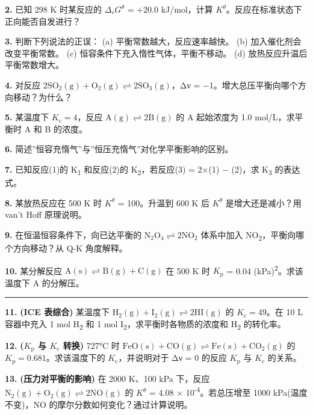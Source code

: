 \textbf{2.} 已知 298 K 时某反应的 \(\Delta_r G^\theta\) = +20.0 kJ/mol，计算 \(K^\theta\)。反应在标准状态下正向能否自发进行？

\textbf{3.} 判断下列说法的正误：
(a) 平衡常数越大，反应速率越快。
(b) 加入催化剂会改变平衡常数。
(c) 恒容条件下充入惰性气体，平衡不移动。
(d) 放热反应升温后平衡常数增大。

\textbf{4.} 对反应 \(\mathrm{2SO_2(g) + O_2(g) \rightleftharpoons 2SO_3(g)}\)，Δν = −1。增大总压平衡向哪个方向移动？为什么？

\textbf{5.} 某温度下 \(K_{\mathrm c} = 4\)，反应 \(\mathrm{A(g) \rightleftharpoons 2B(g)}\) 的 A 起始浓度为 1.0 mol/L，求平衡时 A 和 B 的浓度。

\textbf{6.} 简述''恒容充惰气''与''恒压充惰气''对化学平衡影响的区别。

\textbf{7.} 已知反应(1)的 K\textsubscript{1} 和反应(2)的 K\textsubscript{2}，若反应(3) = 2×(1) − (2)，求 K\textsubscript{3} 的表达式。

\textbf{8.} 某放热反应在 500 K 时 \(K^\theta\) = 100。升温到 600 K 后 \(K^\theta\) 是增大还是减小？用 van't Hoff 原理说明。

\textbf{9.} 在恒温恒容条件下，向已达平衡的 \(\mathrm{N_2O_4 \rightleftharpoons 2NO_2}\) 体系中加入 NO\textsubscript{2}，平衡向哪个方向移动？从 Q-K 角度解释。

\textbf{10.} 某分解反应 \(\mathrm{A(s) \rightleftharpoons B(g) + C(g)}\) 在 500 K 时 \(K_{\mathrm p}\) = 0.04 (kPa)\textsuperscript{2}。求该温度下 A 的分解压。

\begin{center}\rule{0.5\linewidth}{0.5pt}\end{center}

\textbf{11.} \textbf{(ICE 表综合)} 某温度下 \(\mathrm{H_2(g) + I_2(g) \rightleftharpoons 2HI(g)}\) 的 \(K_{\mathrm c} = 49\)。在 10 L 容器中充入 1 mol H\textsubscript{2} 和 1 mol I\textsubscript{2}，求平衡时各物质的浓度和 H\textsubscript{2} 的转化率。

\textbf{12.} \textbf{(\(K_{\mathrm p}\) 与 \(K_{\mathrm c}\) 转换)} 727°C 时 \(\mathrm{FeO(s) + CO(g) \rightleftharpoons Fe(s) + CO_2(g)}\) 的 \(K_{\mathrm p} = 0.681\)。求该温度下的 \(K_{\mathrm c}\)，并说明对于 Δν = 0 的反应 \(K_{\mathrm p}\) 与 \(K_{\mathrm c}\) 的关系。

\textbf{13.} \textbf{(压力对平衡的影响)} 在 2000 K、100 kPa 下，反应 \(\mathrm{N_2(g) + O_2(g) \rightleftharpoons 2NO(g)}\) 的 \(K^\theta\) = 4.08 × 10\textsuperscript{-4}。若总压增至 1000 kPa(温度不变)，NO 的摩尔分数如何变化？通过计算说明。

